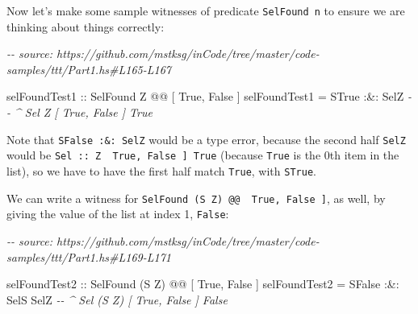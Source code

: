 \documentclass[]{article}
\newenvironment{Shaded}{}{}
\newcommand{\CommentTok}[1]{\textcolor[rgb]{0.38,0.63,0.69}{\textit{#1}}}
\newcommand{\DataTypeTok}[1]{\textcolor[rgb]{0.56,0.13,0.00}{#1}}
\newcommand{\NormalTok}[1]{#1}
\newcommand{\OperatorTok}[1]{\textcolor[rgb]{0.40,0.40,0.40}{#1}}
\newcommand{\OtherTok}[1]{\textcolor[rgb]{0.00,0.44,0.13}{#1}}
\begin{document}
Now let's make some sample witnesses of predicate \texttt{SelFound\ n} to ensure
we are thinking about things correctly:

\begin{Shaded}
\begin{Highlighting}[]
\CommentTok{{-}{-} source: https://github.com/mstksg/inCode/tree/master/code{-}samples/ttt/Part1.hs\#L165{-}L167}

\OtherTok{selFoundTest1 ::} \DataTypeTok{SelFound} \DataTypeTok{\textquotesingle{}Z} \OperatorTok{@@}\NormalTok{ \textquotesingle{}[ }\DataTypeTok{\textquotesingle{}True}\NormalTok{, }\DataTypeTok{\textquotesingle{}False}\NormalTok{ ]}
\NormalTok{selFoundTest1 }\OtherTok{=} \DataTypeTok{STrue} \OperatorTok{:\&:} \DataTypeTok{SelZ}
                       \CommentTok{{-}{-} \^{} Sel \textquotesingle{}Z \textquotesingle{}[ \textquotesingle{}True, \textquotesingle{}False ] \textquotesingle{}True}
\end{Highlighting}
\end{Shaded}

Note that \texttt{SFalse\ :\&:\ SelZ} would be a type error, because the second
half \texttt{SelZ} would be
\texttt{Sel\ ::\ \textquotesingle{}Z\ \textquotesingle{}{[}\ \textquotesingle{}True,\ \textquotesingle{}False\ {]}\ \textquotesingle{}True}
(because \texttt{\textquotesingle{}True} is the 0th item in the list), so we
have to have the first half match \texttt{\textquotesingle{}True}, with
\texttt{STrue}.

We can write a witness for
\texttt{SelFound\ (\textquotesingle{}S\ \textquotesingle{}Z)\ @@\ \textquotesingle{}{[}\ \textquotesingle{}True,\ \textquotesingle{}False\ {]}},
as well, by giving the value of the list at index 1,
\texttt{\textquotesingle{}False}:

\begin{Shaded}
\begin{Highlighting}[]
\CommentTok{{-}{-} source: https://github.com/mstksg/inCode/tree/master/code{-}samples/ttt/Part1.hs\#L169{-}L171}

\OtherTok{selFoundTest2 ::} \DataTypeTok{SelFound}\NormalTok{ (}\DataTypeTok{\textquotesingle{}S} \DataTypeTok{\textquotesingle{}Z}\NormalTok{) }\OperatorTok{@@}\NormalTok{ \textquotesingle{}[ }\DataTypeTok{\textquotesingle{}True}\NormalTok{, }\DataTypeTok{\textquotesingle{}False}\NormalTok{ ]}
\NormalTok{selFoundTest2 }\OtherTok{=} \DataTypeTok{SFalse} \OperatorTok{:\&:} \DataTypeTok{SelS} \DataTypeTok{SelZ}
                        \CommentTok{{-}{-} \^{} Sel (\textquotesingle{}S \textquotesingle{}Z) \textquotesingle{}[ \textquotesingle{}True, \textquotesingle{}False ] \textquotesingle{}False}
\end{Highlighting}
\end{Shaded}
\end{document}
